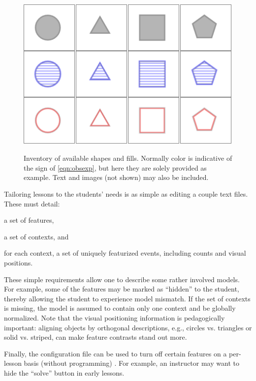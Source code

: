 \documentclass[11pt,letterpaper]{article}
\begin{document}
\begin{figure}[t]
\begin{center}
\centering
\includegraphics[scale=.5]{images/different_shapes_fills3x4.PNG}
\caption{Inventory of available shapes and fills. Normally color is indicative of 
the sign of \eqref{eqn:obsexp}, but here they are solely provided as example. 
Text and images (not shown) may also be included.}
\label{fig:shape_inventory}
\label{fig:inventory}
\end{center}
\end{figure}

Tailoring lessons to the students' needs is as simple as editing a couple text files. These must detail:
\begin{inparaenum}[(1)]
\item a set of features, 
\item a set of contexts, and
\item for each context, a set of uniquely featurized events, including counts and visual positions.
\end{inparaenum}
These simple requirements allow one to describe some rather involved models. For example, some of 
the features may be marked as ``hidden'' to the student, thereby allowing the student to experience 
model mismatch. If the set of contexts is missing, the model is assumed to contain only 
one context and be globally normalized. Note that the visual positioning information is pedagogically 
important: aligning objects by orthogonal descriptions, e.g., circles vs. triangles or solid vs. striped, 
can make feature contrasts stand out more.

Finally, the configuration file can be used to turn off certain
features on a per-lesson basis (without programming) .  For example, 
an instructor may want to hide the ``solve'' button in early lessons.
\end{document}
